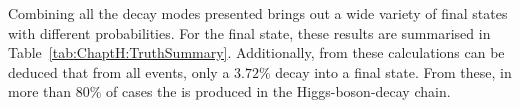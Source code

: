 Combining all the decay modes presented brings out a wide variety of final states 
with different probabilities. For the \dileptau final state, these results are summarised in
Table~\ref{tab:ChaptH:TruthSummary}. %
Additionally, from these calculations can be deduced that from all \tHq events, only
a $3.72\%$ decay into a \dileptau final state. %
From these, in more than 80\% of cases the \tauhad is produced in
the Higgs-boson-decay chain.


	





